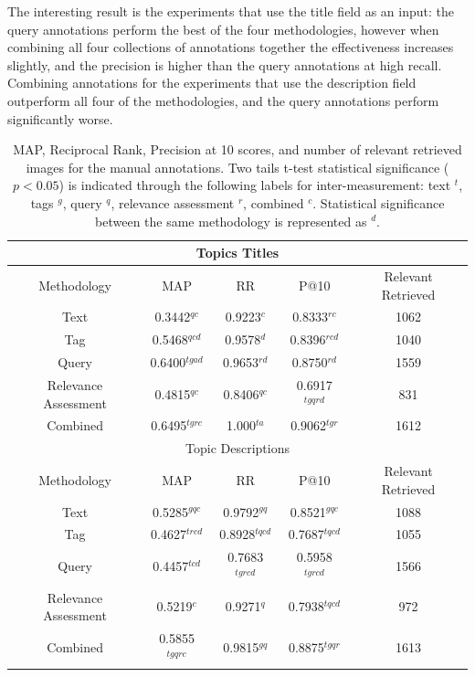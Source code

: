 The interesting result is the experiments that use the title field as an input: the query annotations perform the best of the four methodologies, however when combining all four collections of annotations together the effectiveness increases slightly, and the precision is higher than the query annotations at high recall. Combining annotations for the experiments that use the description field outperform all four of the methodologies, and the query annotations perform significantly worse.

\begin{table}[ht]
    \begin{tabular}{|c|c|c|c|c|}
        \multicolumn{5}{c}{Topics Titles}\\ \hline
         Methodology & MAP & RR & P@10 & Relevant Retrieved \\ \hline
         Text & 0.3442$^{qc}$ & 0.9223$^{c}$ & 0.8333$^{rc}$ & 1062 \\ \hline
         Tag & 0.5468$^{qcd}$ & 0.9578$^{d}$ & 0.8396$^{rcd}$ & 1040 \\ \hline
         Query & 0.6400$^{tgad}$ & 0.9653$^{rd}$ & 0.8750$^{rd}$ & 1559 \\ \hline
         Relevance Assessment & 0.4815$^{qc}$ & 0.8406$^{qc}$ & 0.6917$^{tgqrd}$ & 831 \\ \hline
         Combined & 0.6495$^{tgrc}$ & 1.000$^{ta}$ & 0.9062$^{tgr}$ & 1612 \\ \hline
         \multicolumn{5}{c}{Topic Descriptions} \\ \hline
         Methodology & MAP & RR & P@10 & Relevant Retrieved \\ \hline
         Text & 0.5285$^{gqc}$ & 0.9792$^{gq}$ & 0.8521$^{gqc}$ & 1088 \\ \hline
         Tag & 0.4627$^{trcd}$ & 0.8928$^{tqcd}$ & 0.7687$^{tqcd}$ & 1055 \\ \hline
         Query & 0.4457$^{tcd}$ & 0.7683$^{tgrcd}$ & 0.5958$^{tgrcd}$ & 1566 \\ \hline
         Relevance Assessment & 0.5219$^{c}$ & 0.9271$^{q}$ & 0.7938$^{tqcd}$ & 972 \\ \hline
         Combined & 0.5855$^{tgqrc}$ & 0.9815$^{gq}$ & 0.8875$^{tgqr}$ & 1613 \\ \hline         
    \end{tabular}
    \caption{MAP, Reciprocal Rank, Precision at 10 scores, and number of relevant retrieved images for the manual annotations. Two tails t-test statistical significance ($p<0.05$) is indicated through the following labels for inter-measurement: text $^t$, tags $^g$, query $^q$, relevance assessment $^r$, combined $^c$. Statistical significance between the same methodology is represented as $^d$.}
    \label{table:manual-results}
\end{table}

